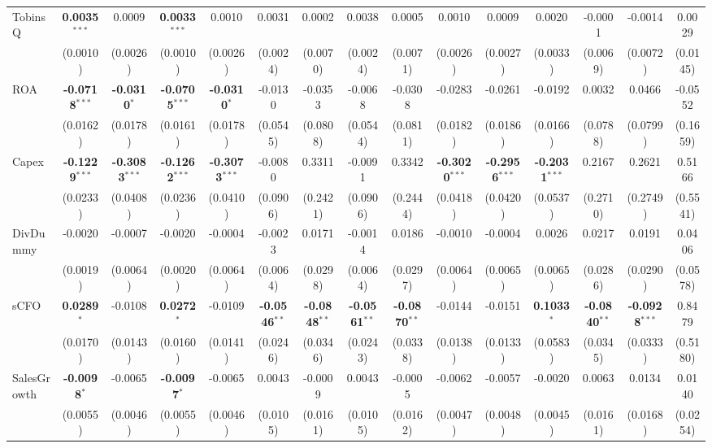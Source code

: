 \documentclass[11pt,a4paper]{article}
\begin{document}
\begin{table}[htbp]
\begin{tabular}{lcccccccccccccc}
TobinsQ & \textbf{0.0035}$^{***}$ & 0.0009 & \textbf{0.0033}$^{***}$ & 0.0010 & 0.0031 & 0.0002 & 0.0038 & 0.0005 & 0.0010 & 0.0009 & 0.0020 & -0.0001 & -0.0014 & 0.0029 \\
 & (0.0010) & (0.0026) & (0.0010) & (0.0026) & (0.0024) & (0.0070) & (0.0024) & (0.0071) & (0.0026) & (0.0027) & (0.0033) & (0.0069) & (0.0072) & (0.0145) \\
ROA & \textbf{-0.0718}$^{***}$ & \textbf{-0.0310}$^{*}$ & \textbf{-0.0705}$^{***}$ & \textbf{-0.0310}$^{*}$ & -0.0130 & -0.0353 & -0.0068 & -0.0308 & -0.0283 & -0.0261 & -0.0192 & 0.0032 & 0.0466 & -0.0552 \\
 & (0.0162) & (0.0178) & (0.0161) & (0.0178) & (0.0545) & (0.0808) & (0.0544) & (0.0811) & (0.0182) & (0.0186) & (0.0166) & (0.0788) & (0.0799) & (0.1659) \\
Capex & \textbf{-0.1229}$^{***}$ & \textbf{-0.3083}$^{***}$ & \textbf{-0.1262}$^{***}$ & \textbf{-0.3073}$^{***}$ & -0.0080 & 0.3311 & -0.0091 & 0.3342 & \textbf{-0.3020}$^{***}$ & \textbf{-0.2956}$^{***}$ & \textbf{-0.2031}$^{***}$ & 0.2167 & 0.2621 & 0.5166 \\
 & (0.0233) & (0.0408) & (0.0236) & (0.0410) & (0.0906) & (0.2421) & (0.0906) & (0.2444) & (0.0418) & (0.0420) & (0.0537) & (0.2710) & (0.2749) & (0.5541) \\
DivDummy & -0.0020 & -0.0007 & -0.0020 & -0.0004 & -0.0023 & 0.0171 & -0.0014 & 0.0186 & -0.0010 & -0.0004 & 0.0026 & 0.0217 & 0.0191 & 0.0406 \\
 & (0.0019) & (0.0064) & (0.0020) & (0.0064) & (0.0064) & (0.0298) & (0.0064) & (0.0297) & (0.0064) & (0.0065) & (0.0065) & (0.0286) & (0.0290) & (0.0578) \\
sCFO & \textbf{0.0289}$^{*}$ & -0.0108 & \textbf{0.0272}$^{*}$ & -0.0109 & \textbf{-0.0546}$^{**}$ & \textbf{-0.0848}$^{**}$ & \textbf{-0.0561}$^{**}$ & \textbf{-0.0870}$^{**}$ & -0.0144 & -0.0151 & \textbf{0.1033}$^{*}$ & \textbf{-0.0840}$^{**}$ & \textbf{-0.0928}$^{***}$ & 0.8479 \\
 & (0.0170) & (0.0143) & (0.0160) & (0.0141) & (0.0246) & (0.0346) & (0.0243) & (0.0338) & (0.0138) & (0.0133) & (0.0583) & (0.0345) & (0.0333) & (0.5180) \\
SalesGrowth & \textbf{-0.0098}$^{*}$ & -0.0065 & \textbf{-0.0097}$^{*}$ & -0.0065 & 0.0043 & -0.0009 & 0.0043 & -0.0005 & -0.0062 & -0.0057 & -0.0020 & 0.0063 & 0.0134 & 0.0140 \\
 & (0.0055) & (0.0046) & (0.0055) & (0.0046) & (0.0105) & (0.0161) & (0.0105) & (0.0162) & (0.0047) & (0.0048) & (0.0045) & (0.0161) & (0.0168) & (0.0254) \\

\end{tabular}
\end{table}
\end{document}
